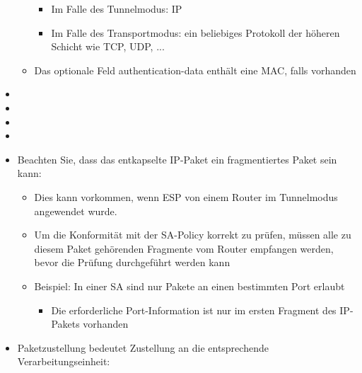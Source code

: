 \documentclass[a4paper]{article}
\begin{document}
\begin{multicols}{3}
\begin{itemize}
\begin{itemize}
                        \begin{itemize}
                            \item
                                  Im Falle des Tunnelmodus: IP
                            \item
                                  Im Falle des Transportmodus: ein beliebiges Protokoll der höheren
                                  Schicht wie TCP, UDP, ...
                        \end{itemize}
                  \item
                        Das optionale Feld authentication-data enthält eine MAC, falls
                        vorhanden
              \end{itemize}
        \item
        \item
        \item
        \item
        \item
              Beachten Sie, dass das entkapselte IP-Paket ein fragmentiertes Paket
              sein kann:

              \begin{itemize}
                  \item
                        Dies kann vorkommen, wenn ESP von einem Router im Tunnelmodus
                        angewendet wurde.
                  \item
                        Um die Konformität mit der SA-Policy korrekt zu prüfen, müssen alle
                        zu diesem Paket gehörenden Fragmente vom Router empfangen werden,
                        bevor die Prüfung durchgeführt werden kann
                  \item
                        Beispiel: In einer SA sind nur Pakete an einen bestimmten Port
                        erlaubt

                        \begin{itemize}
                            \item
                                  Die erforderliche Port-Information ist nur im ersten Fragment des
                                  IP-Pakets vorhanden
                        \end{itemize}
              \end{itemize}
        \item
              Paketzustellung bedeutet Zustellung an die entsprechende
              Verarbeitungseinheit:


\end{itemize}
\end{multicols}
\end{document}
